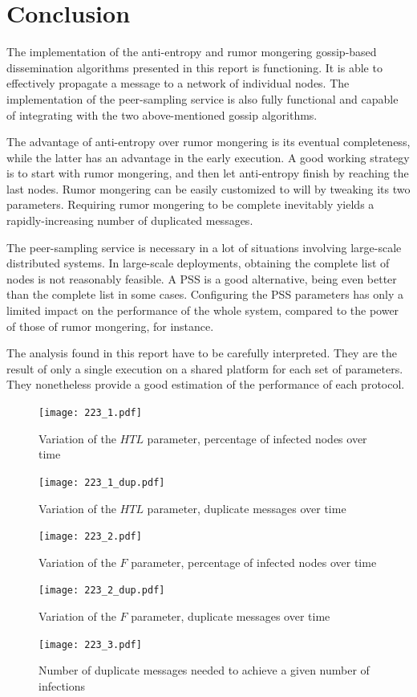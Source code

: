 \documentclass[11pt,a4paper]{scrartcl}
\begin{document}
\section{Conclusion}

The implementation of the anti-entropy and rumor mongering gossip-based dissemination algorithms presented in this report is functioning. It is able to effectively propagate a message to a network of individual nodes. The implementation of the peer-sampling service is also fully functional and capable of integrating with the two above-mentioned gossip algorithms.

The advantage of anti-entropy over rumor mongering is its eventual completeness, while the latter has an advantage in the early execution. A good working strategy is to start with rumor mongering, and then let anti-entropy finish by reaching the last nodes. Rumor mongering can be easily customized to will by tweaking its two parameters. Requiring rumor mongering to be complete inevitably yields a rapidly-increasing number of duplicated messages.

The peer-sampling service is necessary in a lot of situations involving large-scale distributed systems. In large-scale deployments, obtaining the complete list of nodes is not reasonably feasible. A PSS is a good alternative, being even better than the complete list in some cases. Configuring the PSS parameters has only a limited impact on the performance of the whole system, compared to the power of those of rumor mongering, for instance.

The analysis found in this report have to be carefully interpreted. They are the result of only a single execution on a shared platform for each set of parameters. They nonetheless provide a good estimation of the performance of each protocol.


\begin{figure}
	\centering
	\texttt{[image: 223\_1.pdf]}
	\caption{Variation of the $HTL$ parameter, percentage of infected nodes over time}
	\label{fig:223-1}
\end{figure}
\begin{figure}
	\centering
	\texttt{[image: 223\_1\_dup.pdf]}
	\caption{Variation of the $HTL$ parameter, duplicate messages over time}
	\label{fig:223-1-dup}
\end{figure}
\begin{figure}
	\centering
	\texttt{[image: 223\_2.pdf]}
	\caption{Variation of the $F$ parameter, percentage of infected nodes over time}
	\label{fig:223-2}
\end{figure}
\begin{figure}
	\centering
	\texttt{[image: 223\_2\_dup.pdf]}
	\caption{Variation of the $F$ parameter, duplicate messages over time}
	\label{fig:223-2-dup}
\end{figure}
\begin{figure}
	\centering
	\texttt{[image: 223\_3.pdf]}
	\caption{Number of duplicate messages needed to achieve a given number of infections}
	\label{fig:223-3}
\end{figure}
\end{document}
